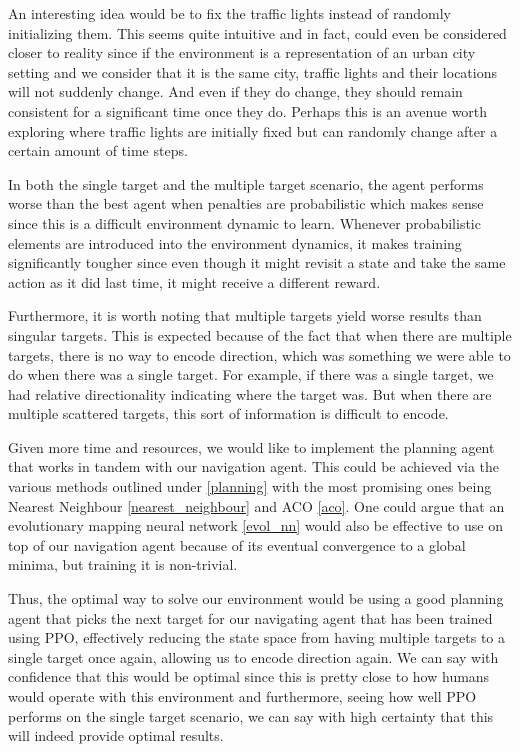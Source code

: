 \documentclass{article}
\begin{document}
	An interesting idea would be to fix the traffic lights instead of randomly initializing them. This seems quite intuitive and in fact, could even be considered closer to reality since if the environment is a representation of an urban city setting and we consider that it is the same city, traffic lights and their locations will not suddenly change. And even if they do change, they should remain consistent for a significant time once they do. Perhaps this is an avenue worth exploring where traffic lights are initially fixed but can randomly change after a certain amount of time steps. 
	
	In both the single target and the multiple target scenario, the agent performs worse than the best agent when penalties are probabilistic which makes sense since this is a difficult environment dynamic to learn. Whenever probabilistic elements are introduced into the environment dynamics, it makes training significantly tougher since even though it might revisit a state and take the same action as it did last time, it might receive a different reward.
	
	Furthermore, it is worth noting that multiple targets yield worse results than singular targets. This is expected because of the fact that when there are multiple targets, there is no way to encode direction, which was something we were able to do when there was a single target. For example, if there was a single target, we had relative directionality indicating where the target was. But when there are multiple scattered targets, this sort of information is difficult to encode. 
	
	Given more time and resources, we would like to implement the planning agent that works in tandem with our navigation agent. This could be achieved via the various methods outlined under \ref{planning} with the most promising ones being Nearest Neighbour \ref{nearest_neighbour} and ACO \ref{aco}. One could argue that an evolutionary mapping neural network \ref{evol_nn} would also be effective to use on top of our navigation agent because of its eventual convergence to a global minima, but training it is non-trivial.
	
	Thus, the optimal way to solve our environment would be using a good planning agent that picks the next target for our navigating agent that has been trained using PPO, effectively reducing the state space from having multiple targets to a single target once again, allowing us to encode direction again. We can say with confidence that this would be optimal since this is pretty close to how humans would operate with this environment and furthermore, seeing how well PPO performs on the single target scenario, we can say with high certainty that this will indeed provide optimal results.
	
\end{document}

